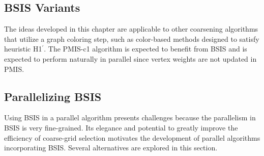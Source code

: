 \documentclass{elsart}
\begin{document}
\subsection{BSIS Variants}
The ideas developed in this chapter are applicable to other coarsening
algorithms that utilize a graph coloring step, such as color-based
methods designed to satisfy heuristic H1$^\prime$. The PMIS-c1
algorithm is expected to benefit from BSIS and is expected to perform
naturally in parallel since vertex weights are not updated in PMIS.

\subsection{Parallelizing BSIS}
Using BSIS in a parallel algorithm presents challenges because the
parallelism in BSIS is very fine-grained. Its elegance and potential
to greatly improve the efficiency of coarse-grid selection motivates
the development of parallel algorithms incorporating BSIS. Several
alternatives are explored in this section.
\end{document}
